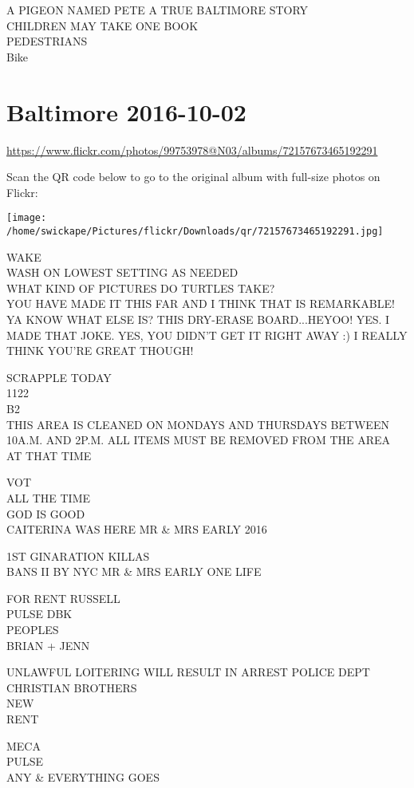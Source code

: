 \documentclass[10pt,letterpaper]{article}
\begin{document}
A PIGEON NAMED PETE A TRUE BALTIMORE STORY\\
CHILDREN MAY TAKE ONE BOOK\\
PEDESTRIANS\\
Bike


\section*{Baltimore 2016-10-02}

\url{https://www.flickr.com/photos/99753978@N03/albums/72157673465192291}

Scan the QR code below to go to the original album with full-size photos on Flickr:

\texttt{[image: /home/swickape/Pictures/flickr/Downloads/qr/72157673465192291.jpg]}


WAKE\\
WASH ON LOWEST SETTING AS NEEDED\\
WHAT KIND OF PICTURES DO TURTLES TAKE?\\
YOU HAVE MADE IT THIS FAR AND I THINK THAT IS REMARKABLE!  YA KNOW WHAT ELSE IS?  THIS DRY{-}ERASE BOARD...HEYOO! YES.  I MADE THAT JOKE.  YES, YOU DIDN'T GET IT RIGHT AWAY :) I REALLY THINK YOU'RE GREAT THOUGH!

SCRAPPLE TODAY\\
1122\\
B2\\
THIS AREA IS CLEANED ON MONDAYS AND THURSDAYS BETWEEN 10A.M. AND 2P.M. ALL ITEMS MUST BE REMOVED FROM THE AREA AT THAT TIME

VOT\\
ALL THE TIME\\
GOD IS GOOD\\
CAITERINA WAS HERE MR \& MRS EARLY 2016

1ST GINARATION KILLAS\\
BANS II BY NYC MR \& MRS EARLY ONE LIFE

FOR RENT RUSSELL\\
PULSE DBK\\
PEOPLES\\
BRIAN + JENN

UNLAWFUL LOITERING WILL RESULT IN ARREST POLICE DEPT\\
CHRISTIAN BROTHERS\\
NEW\\
RENT

MECA\\
PULSE\\
ANY \& EVERYTHING GOES
\end{document}
